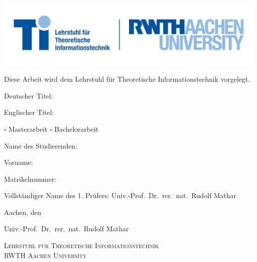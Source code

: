 \begin{titlepage}
\vspace*{-40mm}
\begin{flushright}
\includegraphics{figures/rwth_ti_de_rgb.jpg}
\end{flushright}
{
\centering

\vspace*{-10mm}

\twolinestop

\vspace*{5mm}

Diese Arbeit wird dem Lehrstuhl für Theoretische Informationstechnik vorgelegt.

\vspace*{1cm}
Deutscher Titel: \hrulefill

\hrulefill

Englischer Titel: \hrulefill
	
\hrulefill

$\square$ Masterarbeit \hspace*{10mm} $\square$ Bachelorarbeit

\vspace*{8mm}

Name des Studierenden: \hrulefill\hrulefill

Vorname:\hspace*{25mm} \hrulefill\hrulefill

	Matrikelnummer:\hspace*{12mm}  \hrulefill \hrulefill

} %

\vspace*{8mm}

Vollständiger Name des 1. Prüfers: Univ.-Prof.~Dr.~rer.~nat.~Rudolf Mathar

\vspace*{10mm}

Aachen, den 

\vspace*{-5mm}
\hspace*{75mm} \hrulefill 
	
\vspace*{-5mm}
\hfill Univ.-Prof.~Dr.~rer.~nat.~Rudolf Mathar

\vspace*{12mm}
	{
\centering
{\large \textsc{Lehrstuhl für Theoretische Informationstechnik}}\\[0.5\baselineskip] %
{\large \textsc{RWTH Aachen University}}\par %
%
%
\twolinesbottom
} %

\end{titlepage}


